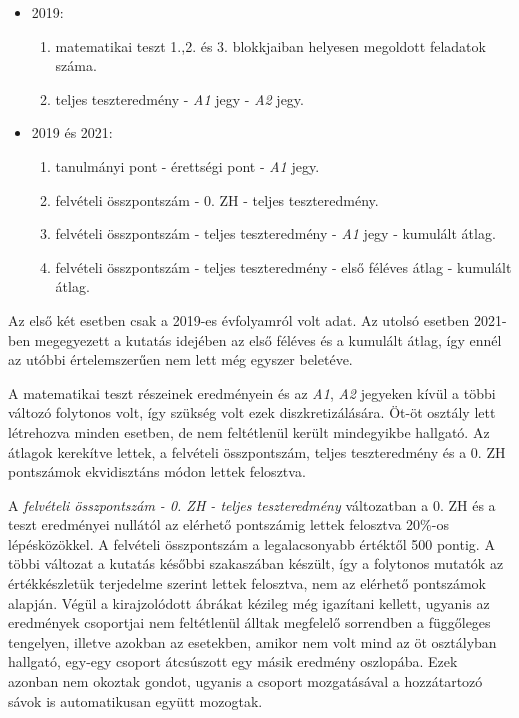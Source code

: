\documentclass[12pt]{article}
\begin{document}
\begin{itemize}

\item 2019:

\begin{enumerate}
\item matematikai teszt 1.,2. és 3. blokkjaiban helyesen megoldott feladatok száma.
\item teljes teszteredmény - \textit{A1} jegy - \textit{A2} jegy.
\end{enumerate}

\item 2019 és 2021:

\begin{enumerate}
\item tanulmányi pont - érettségi pont - \textit{A1} jegy.
\item felvételi összpontszám - 0. ZH - teljes teszteredmény.
\item felvételi összpontszám - teljes teszteredmény - \textit{A1} jegy - kumulált átlag.
\item felvételi összpontszám - teljes teszteredmény - első féléves átlag - kumulált átlag.
\end{enumerate}

\end{itemize}

Az első két esetben csak a 2019-es évfolyamról volt adat. Az utolsó esetben 2021-ben megegyezett a kutatás idejében az első féléves és a kumulált átlag, így ennél az utóbbi értelemszerűen nem lett még egyszer beletéve.

A matematikai teszt részeinek eredményein és az \textit{A1}, \textit{A2} jegyeken kívül a többi változó folytonos volt, így szükség volt ezek diszkretizálására. Öt-öt osztály lett létrehozva minden esetben, de nem feltétlenül került mindegyikbe hallgató. Az átlagok kerekítve lettek, a felvételi összpontszám, teljes teszteredmény és a 0. ZH pontszámok ekvidisztáns módon lettek felosztva.

A \textit{felvételi összpontszám - 0. ZH - teljes teszteredmény} változatban a 0. ZH és a teszt eredményei nullától az elérhető pontszámig lettek felosztva 20\%-os lépésközökkel. A felvételi összpontszám a legalacsonyabb értéktől 500 pontig. A többi változat a kutatás későbbi szakaszában készült, így a folytonos mutatók az értékkészletük terjedelme szerint lettek felosztva, nem az elérhető pontszámok alapján. Végül a kirajzolódott ábrákat kézileg még igazítani kellett, ugyanis az eredmények csoportjai nem feltétlenül álltak megfelelő sorrendben a függőleges tengelyen, illetve azokban az esetekben, amikor nem volt mind az öt osztályban hallgató, egy-egy csoport átcsúszott egy másik eredmény oszlopába. Ezek azonban nem okoztak gondot, ugyanis a csoport mozgatásával a hozzátartozó sávok is automatikusan együtt mozogtak.
\end{document}
